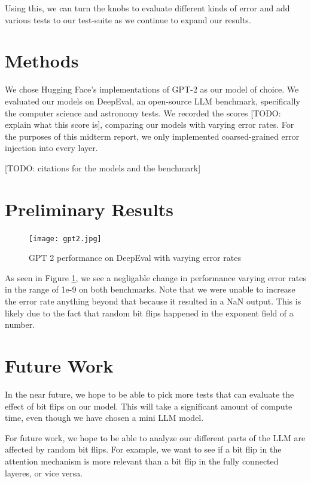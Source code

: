 \documentclass[a4paper]{article}
\begin{document}
Using this, we can turn the knobs to evaluate different kinds of error and add various tests to our test-suite as we continue to expand our results.

\section{Methods}
We chose Hugging Face's implementations of GPT-2 as our model of choice. We evaluated our models on DeepEval, an open-source LLM benchmark, specifically the computer science and astronomy tests. We recorded the scores [TODO: explain what this score is], comparing our models with varying error rates. For the purposes of this midterm report, we only implemented coarsed-grained error injection into every layer.

[TODO: citations for the models and the benchmark]

\section{Preliminary Results}
\begin{figure}[ht]
	\begin{center}
		\texttt{[image: gpt2.jpg]}
		\caption{GPT 2 performance on DeepEval with varying error rates}
		\label{gpt2-res}
	\end{center}
\end{figure}

As seen in Figure \ref{gpt2-res}, we see a negligable change in performance varying error rates in the range of 1e-9 on both benchmarks. Note that we were unable to increase the error rate anything beyond that because it resulted in a NaN output. This is likely due to the fact that random bit flips happened in the exponent field of a number.

\section{Future Work}

In the near future, we hope to be able to pick more tests that can evaluate the effect of bit flips on our model. This will take a significant amount of compute time, even though we have chosen a mini LLM model.

For future work, we hope to be able to analyze our different parts of the LLM are affected by random bit flips. For example, we want to see if a bit flip in the attention mechanism is more relevant than a bit flip in the fully connected layeres, or vice versa. 
\end{document}
